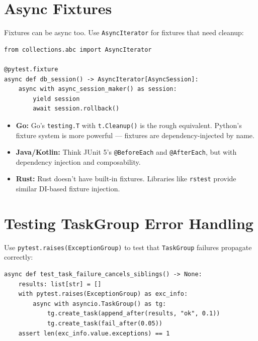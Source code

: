 \documentclass[11pt,a4paper,oneside]{book}
\newcommand{\py}[1]{\texttt{\color{pyblue}#1}}
\begin{document}
\section{Async Fixtures}

Fixtures can be async too. Use \py{AsyncIterator} for fixtures that need cleanup:

\begin{lstlisting}[style=python]
from collections.abc import AsyncIterator

@pytest.fixture
async def db_session() -> AsyncIterator[AsyncSession]:
    async with async_session_maker() as session:
        yield session
        await session.rollback()
\end{lstlisting}

\begin{analogybox}
\begin{itemize}
    \item \textcolor{goblue}{\textbf{Go:}} Go's \texttt{testing.T} with \texttt{t.Cleanup()}
          is the rough equivalent. Python's fixture system is more powerful --- fixtures are
          dependency-injected by name.
    \item \textcolor{javaorange}{\textbf{Java/Kotlin:}} Think JUnit 5's \texttt{@BeforeEach}
          and \texttt{@AfterEach}, but with dependency injection and composability.
    \item \textcolor{BrickRed}{\textbf{Rust:}} Rust doesn't have built-in fixtures. Libraries
          like \texttt{rstest} provide similar DI-based fixture injection.
\end{itemize}
\end{analogybox}

\section{Testing TaskGroup Error Handling}

Use \py{pytest.raises(ExceptionGroup)} to test that \py{TaskGroup} failures propagate correctly:

\begin{lstlisting}[style=python]
async def test_task_failure_cancels_siblings() -> None:
    results: list[str] = []
    with pytest.raises(ExceptionGroup) as exc_info:
        async with asyncio.TaskGroup() as tg:
            tg.create_task(append_after(results, "ok", 0.1))
            tg.create_task(fail_after(0.05))
    assert len(exc_info.value.exceptions) == 1
\end{lstlisting}
\end{document}
